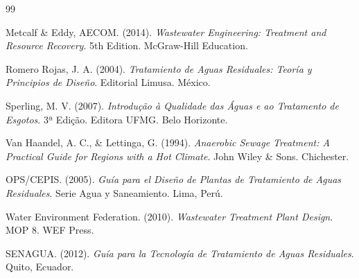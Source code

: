 \documentclass[12pt,a4paper]{article}
\begin{document}
\newpage
\begin{thebibliography}{99}

Metcalf \& Eddy, AECOM. (2014). 
\textit{Wastewater Engineering: Treatment and Resource Recovery}. 
5th Edition. McGraw-Hill Education.

Romero Rojas, J. A. (2004). 
\textit{Tratamiento de Aguas Residuales: Teoría y Principios de Diseño}.
Editorial Limusa. México.

Sperling, M. V. (2007). 
\textit{Introdução à Qualidade das Águas e ao Tratamento de Esgotos}.
3ª Edição. Editora UFMG. Belo Horizonte.

Van Haandel, A. C., \& Lettinga, G. (1994). 
\textit{Anaerobic Sewage Treatment: A Practical Guide for Regions with a Hot Climate}.
John Wiley \& Sons. Chichester.

OPS/CEPIS. (2005). 
\textit{Guía para el Diseño de Plantas de Tratamiento de Aguas Residuales}.
Serie Agua y Saneamiento. Lima, Perú.

Water Environment Federation. (2010). 
\textit{Wastewater Treatment Plant Design}. MOP 8. WEF Press.

SENAGUA. (2012). 
\textit{Guía para la Tecnología de Tratamiento de Aguas Residuales}.
Quito, Ecuador.

\end{thebibliography}
\end{document}
